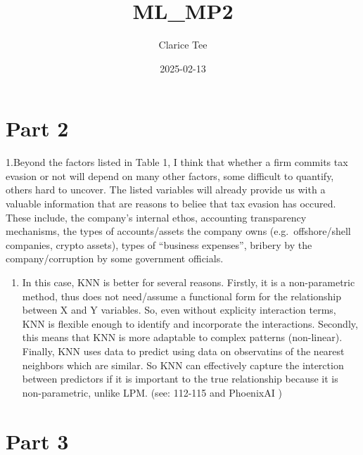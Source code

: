 \documentclass[
  11pt,
  letterpaper,
  DIV=11,
  numbers=noendperiod]{scrartcl}
\title{ML\_MP2}
\author{Clarice Tee}
\date{2025-02-13}
\providecommand{\tightlist}{%
  \setlength{\itemsep}{0pt}\setlength{\parskip}{0pt}}\usepackage{longtable,booktabs,array}
\renewcommand*\contentsname{Table of contents}
\newcommand\contentsname{Table of contents}
\begin{document}
\maketitle


\renewcommand*\contentsname{Table of contents}
{
\hypersetup{linkcolor=}
\setcounter{tocdepth}{3}
\tableofcontents
}

\section{Part 2}\label{part-2}

1.Beyond the factors listed in Table 1, I think that whether a firm
commits tax evasion or not will depend on many other factors, some
difficult to quantify, others hard to uncover. The listed variables will
already provide us with a valuable information that are reasons to
beliee that tax evasion has occured. These include, the company's
internal ethos, accounting transparency mechanisms, the types of
accounts/assets the company owns (e.g.~offshore/shell companies, crypto
assets), types of ``business expenses'', bribery by the
company/corruption by some government officials.

\begin{enumerate}
\def\labelenumi{\arabic{enumi}.}
\setcounter{enumi}{1}
\tightlist
\item
  In this case, KNN is better for several reasons. Firstly, it is a
  non-parametric method, thus does not need/assume a functional form for
  the relationship between X and Y variables. So, even without explicity
  interaction terms, KNN is flexible enough to identify and incorporate
  the interactions. Secondly, this means that KNN is more adaptable to
  complex patterns (non-linear). Finally, KNN uses data to predict using
  data on observatins of the nearest neighbors which are similar. So KNN
  can effectively capture the interction between predictors if it is
  important to the true relationship because it is non-parametric,
  unlike LPM. (see: 112-115 and PhoenixAI )
\end{enumerate}

\section{Part 3}\label{part-3}
\end{document}
